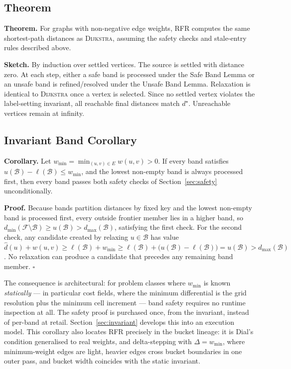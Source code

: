 \documentclass[11pt]{article}
\newcommand{\RFR}{\textsc{RFR}}
\newcommand{\Dijkstra}{\textsc{Dijkstra}}
\newcommand{\frontier}{\mathcal{F}}
\newcommand{\band}{\mathcal{B}}
\newcommand{\edges}{E}
\begin{document}
\subsection{Theorem}

\textbf{Theorem.} For graphs with non-negative edge weights, \RFR{} computes the same shortest-path distances as \Dijkstra{}, assuming the safety checks and stale-entry rules described above.

\textbf{Sketch.} By induction over settled vertices. The source is settled with distance zero. At each step, either a safe band is processed under the Safe Band Lemma or an unsafe band is refined/resolved under the Unsafe Band Lemma. Relaxation is identical to \Dijkstra{} once a vertex is selected. Since no settled vertex violates the label-setting invariant, all reachable final distances match $d^\star$. Unreachable vertices remain at infinity.

\subsection{Invariant Band Corollary}
\label{sec:invariantcorollary}

\textbf{Corollary.} Let $w_{\min}=\min_{(u,v)\in\edges} w(u,v)>0$. If every band satisfies $u(\band)-\ell(\band)\le w_{\min}$, and the lowest non-empty band is always processed first, then every band passes both safety checks of Section~\ref{sec:safety} unconditionally.

\textbf{Proof.} Because bands partition distances by fixed key and the lowest non-empty band is processed first, every outside frontier member lies in a higher band, so $d_{\min}(\frontier\setminus\band)\ge u(\band)>d_{\max}(\band)$, satisfying the first check. For the second check, any candidate created by relaxing $u\in\band$ has value $\hat d(u)+w(u,v)\ge \ell(\band)+w_{\min}\ge \ell(\band)+\bigl(u(\band)-\ell(\band)\bigr)=u(\band)>d_{\max}(\band)$. No relaxation can produce a candidate that precedes any remaining band member. $\square$

The consequence is architectural: for problem classes where $w_{\min}$ is known \emph{statically} --- in particular cost fields, where the minimum differential is the grid resolution plus the minimum cell increment --- band safety requires no runtime inspection at all. The safety proof is purchased once, from the invariant, instead of per-band at retail. Section~\ref{sec:invariant} develops this into an execution model. This corollary also locates \RFR{} precisely in the bucket lineage: it is Dial's condition \cite{dial1969} generalised to real weights, and delta-stepping \cite{meyer2003} with $\Delta=w_{\min}$, where minimum-weight edges are light, heavier edges cross bucket boundaries in one outer pass, and bucket width coincides with the static invariant.
\end{document}
